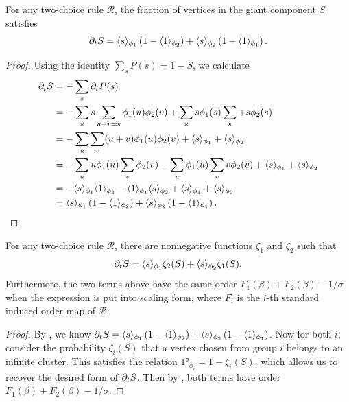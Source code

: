 \documentclass[twoside,10pt]{article}
\begin{document}
\begin{lem}
        \label{2c-sdelS}
        For any two-choice rule $\mathcal{R}$, the fraction of vertices in the giant component $S$ satisfies
	\[
		\partial_{t}{S} = \langle s \rangle_{\phi_1}\left( 1-\langle 1 \rangle_{\phi_2} \right) + \langle s \rangle_{\phi_2}\left( 1-\langle 1 \rangle_{\phi_1} \right).
	\] 
\end{lem}
\begin{proof}
        Using the identity $\sum_s P(s) = 1-S$, we calculate
        \begin{align*}
                \partial_{t}{S} &= - \sum_s \partial_{t}{P(s)} \\
                          &= - \sum_s s \sum_{u+v=s}\phi_1(u)\phi_2(v) + \sum_s s \phi_1(s) \sum_s + s \phi_2(s) \\
                          &= - \sum_u \sum_v (u+v) \phi_1(u)\phi_2(v) + \langle s \rangle_{\phi_1} + \langle s \rangle_{\phi_2} \\
                          &= -\sum_{u}u \phi_1(u) \sum_{v} \phi_2(v) - \sum_{u}\phi_1(u)\sum_{v}v \phi_2(v) + \langle s \rangle_{\phi_1} + \langle s \rangle_{\phi_2} \\
                          &= -\langle s \rangle_{\phi_1}\langle 1 \rangle_{\phi_2} - \langle 1 \rangle_{\phi_1}\langle s \rangle_{\phi_2} + \langle s \rangle_{\phi_1}+\langle s \rangle_{\phi_2} \\
                          &= \langle s \rangle_{\phi_1}\left( 1-\langle 1 \rangle_{\phi_2} \right) + \langle s \rangle_{\phi_2}\left( 1-\langle 1 \rangle_{\phi_1} \right).
        \end{align*}
\end{proof}

\begin{thrm}
	\label{2c-same-order}
	For any two-choice rule $\mathcal{R}$, there are nonnegative functions $\zeta_1$ and $\zeta_2$ such that
	\[
		\partial_{t}{S} = \langle s \rangle_{\phi_1}\zeta_2(S) + \langle s \rangle_{\phi_2}\zeta_1(S).
	\] 
	Furthermore, the two terms above have the same order $F_1(\beta) + F_2(\beta) - 1/\sigma$ when the expression is put into scaling form, where $F_{i}$ is the $i$-th standard induced order map of $\mathcal{R}$.
\end{thrm}
\begin{proof}
	By , we know $\partial_{t}{S} = \langle s \rangle_{\phi_1}\left( 1-\langle 1 \rangle_{\phi_2} \right) + \langle s \rangle_{\phi_2}\left( 1-\langle 1 \rangle_{\phi_1} \right)$. Now for both $i$, consider the probability $\zeta_i(S)$ that a vertex chosen from group $i$ belongs to an infinite cluster. This satisfies the relation $\ang{1}_{\phi_i} = 1-\zeta_i(S)$, which allows us to recover the desired form of $\partial_{t}{S} $. Then by , both terms have order $F_1(\beta) + F_2(\beta) - 1/\sigma$.
\end{proof}
\end{document}
